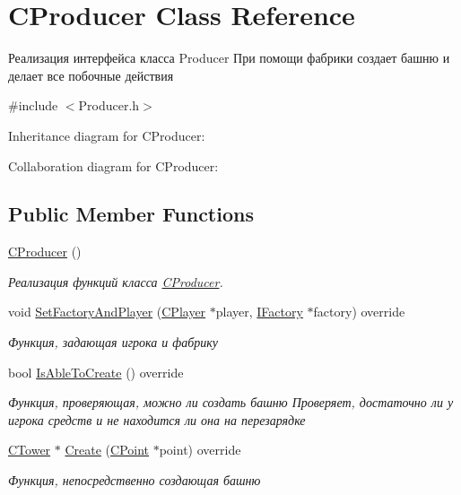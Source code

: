 \hypertarget{classCProducer}{}\section{C\+Producer Class Reference}
\label{classCProducer}


Реализация интерфейса класса Producer При помощи фабрики создает башню и делает все побочные действия  




{\ttfamily \#include $<$Producer.\+h$>$}



Inheritance diagram for C\+Producer\+:


Collaboration diagram for C\+Producer\+:
\subsection*{Public Member Functions}
\begin{DoxyCompactItemize}
\item 
\hyperlink{classCProducer_ad3a08a87755e1b3ac199f48e39efb7b4}{C\+Producer} ()\hypertarget{classCProducer_ad3a08a87755e1b3ac199f48e39efb7b4}{}\label{classCProducer_ad3a08a87755e1b3ac199f48e39efb7b4}

\begin{DoxyCompactList}\small\item\em Реализация функций класса \hyperlink{classCProducer}{C\+Producer}. \end{DoxyCompactList}\item 
void \hyperlink{classCProducer_a2f3a3115610b6f15d03efd30c4e32733}{Set\+Factory\+And\+Player} (\hyperlink{classCPlayer}{C\+Player} $\ast$player, \hyperlink{classIFactory}{I\+Factory} $\ast$factory) override
\begin{DoxyCompactList}\small\item\em Функция, задающая игрока и фабрику \end{DoxyCompactList}\item 
bool \hyperlink{classCProducer_a651ec478d4dcc8f89bea0910df27b417}{Is\+Able\+To\+Create} () override\hypertarget{classCProducer_a651ec478d4dcc8f89bea0910df27b417}{}\label{classCProducer_a651ec478d4dcc8f89bea0910df27b417}

\begin{DoxyCompactList}\small\item\em Функция, проверяющая, можно ли создать башню Проверяет, достаточно ли у игрока средств и не находится ли она на перезарядке \end{DoxyCompactList}\item 
\hyperlink{classCTower}{C\+Tower} $\ast$ \hyperlink{classCProducer_a81087eb26d152b3bb7c299422589d1d1}{Create} (\hyperlink{classCPoint}{C\+Point} $\ast$point) override
\begin{DoxyCompactList}\small\item\em Функция, непосредственно создающая башню \end{DoxyCompactList}\end{DoxyCompactItemize}


